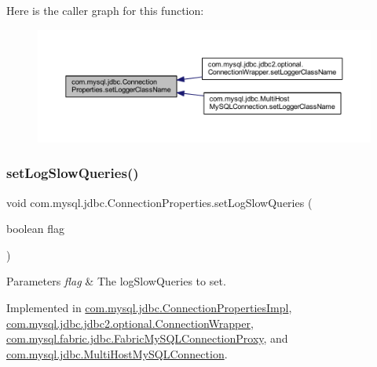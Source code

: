 Here is the caller graph for this function\+:\nopagebreak
\begin{figure}[H]
\begin{center}
\leavevmode
\includegraphics[width=350pt]{interfacecom_1_1mysql_1_1jdbc_1_1_connection_properties_a4bde3c5c986dba54cf5ed53038cb7181_icgraph}
\end{center}
\end{figure}
\mbox{\label{interfacecom_1_1mysql_1_1jdbc_1_1_connection_properties_a7dd83438187fa5956f663b84a604dce3}} 
\subsubsection{\texorpdfstring{set\+Log\+Slow\+Queries()}{setLogSlowQueries()}}
{\footnotesize\ttfamily void com.\+mysql.\+jdbc.\+Connection\+Properties.\+set\+Log\+Slow\+Queries (\begin{DoxyParamCaption}\item[{boolean}]{flag }\end{DoxyParamCaption})}


\begin{DoxyParams}{Parameters}
{\em flag} & The log\+Slow\+Queries to set. \\
\hline
\end{DoxyParams}


Implemented in \mbox{\hyperlink{classcom_1_1mysql_1_1jdbc_1_1_connection_properties_impl_ada15c217d411baff531aeeed04b0690f}{com.\+mysql.\+jdbc.\+Connection\+Properties\+Impl}}, \mbox{\hyperlink{classcom_1_1mysql_1_1jdbc_1_1jdbc2_1_1optional_1_1_connection_wrapper_a392f4a58a5aa8c42317181640bdb6575}{com.\+mysql.\+jdbc.\+jdbc2.\+optional.\+Connection\+Wrapper}}, \mbox{\hyperlink{classcom_1_1mysql_1_1fabric_1_1jdbc_1_1_fabric_my_s_q_l_connection_proxy_a18262ff215f5bc6fd3bfa3f2f42099f7}{com.\+mysql.\+fabric.\+jdbc.\+Fabric\+My\+S\+Q\+L\+Connection\+Proxy}}, and \mbox{\hyperlink{classcom_1_1mysql_1_1jdbc_1_1_multi_host_my_s_q_l_connection_a89d164c3f8f46d2f95ec2b1eae60e344}{com.\+mysql.\+jdbc.\+Multi\+Host\+My\+S\+Q\+L\+Connection}}.

